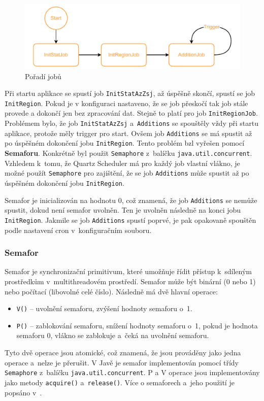 \newpage

\begin{figure}[!h]
    \label{fig:jobs_scheduled}
    \caption{Pořadí jobů}
    \centering
    \includegraphics[width=\textwidth]{figures/jobs_scheduled.pdf}
\end{figure}

Při startu aplikace se spustí job \texttt{InitStatAzZsj}, až úspěšně skončí,
spustí se job \texttt{InitRegion}. Pokud je v konfiguraci nastaveno, že se job 
přeskočí tak job stále provede a dokončí jen bez zpracování dat.
Stejně to platí pro job \texttt{InitRegionJob}.
Problémem bylo, že job \texttt{InitStatAzZsj} a~\texttt{Additions} 
se spouštěly vždy při startu aplikace, protože měly trigger pro start. 
Ovšem job \texttt{Additions} se má spustit až po úspěšném dokončení jobu 
\texttt{InitRegion}. Tento problém bzl vyřešen pomocí \textbf{Semaforu}.
Konkrétně byl použit \texttt{Semaphore} z~balíčku \texttt{java.util.concurrent}.
Vzhledem k~tomu, že Quartz Scheduler má pro každý job vlastní vlákno,
je možné použít \texttt{Semaphore} pro zajištění, že se job \texttt{Additions}
může spustit až po úspěšném dokončení jobu \texttt{InitRegion}.

Semafor je inicializován na hodnotu 0, což znamená, že job \texttt{Additions}
se nemůže spustit, dokud není semafor uvolněn. Ten je uvolněn následně na konci 
jobu \texttt{InitRegion}. Jakmile se job \texttt{Additions} spustí poprvé, je pak 
opakovaně spouštěn podle nastavení cron v~konfiguračním souboru.

\subsubsection*{Semafor}
Semafor je synchronizační primitivum, které umožňuje řídit přístup 
k~sdíleným prostředkům v~multithreadovém prostředí.
Semafor může být binární (0 nebo 1) nebo počítací (libovolné celé číslo).
Následně má dvě hlavní operace:
\begin{itemize}
    \item \texttt{V()} -- uvolnění semaforu, zvýšení hodnoty semaforu o~1.
    \item \texttt{P()} -- zablokování semaforu, snížení hodnoty semaforu o~1, pokud je hodnota semaforu 0, vlákno se zablokuje a~čeká na uvolnění semaforu.
\end{itemize}

Tyto dvě operace jsou atomické, což znamená, že jsou prováděny jako jedna operace a~nelze je přerušit.
V Javě je semafor implementován pomocí třídy \texttt{Semaphore} z~balíčku \texttt{java.util.concurrent}.
P a V operace jsou implementovány jako metody \texttt{acquire()} a~\texttt{release()}.
Více o semaforech a~jeho použití je popsáno v~\cite{pesicka_semafor}. 



